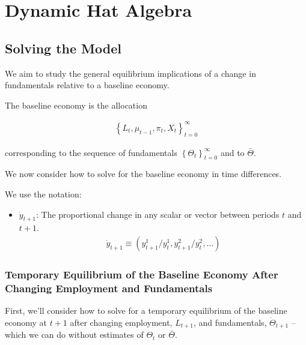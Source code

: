 \documentclass[10pt]{article}
\begin{document}
\section{Dynamic Hat Algebra}

\subsection{Solving the Model}

We aim to study the general equilibrium implications 
of a change in fundamentals relative to a baseline economy.

\begin{definition} 
    The baseline economy is the allocation 
    
    \begin{align}
        \left\{L_t, \mu_{t-1}, \pi_t, X_t\right\}_{t=0}^{\infty}
    \end{align}

    corresponding to the sequence of fundamentals $\left\{\Theta_t\right\}_{t=0}^{\infty}$ and to $\bar{\Theta}$.
\end{definition}

We now consider how to solve for the baseline economy in 
time differences.

We use the notation:

\begin{itemize}
    \item $\dot{y}_{t+1}$: The proportional change in any scalar or 
        vector between periods $t$ and $t+1$.
        \begin{align}
            \dot{y}_{t+1} \equiv\left(y_{t+1}^1 / y_t^1, y_{t+1}^2 / y_t^2, \ldots\right)
        \end{align}
\end{itemize}

\subsubsection{Temporary Equilibrium of the Baseline Economy After Changing Employment and Fundamentals}

First, we'll consider how to solve for a temporary equilibrium
of the baseline economy at $t+1$ after changing employment, $\dot{L}_{t+1}$, 
and fundamentals, $\dot{\Theta}_{t+1}$ -- which we can do without 
estimates of $\Theta_t$ or $\bar{\Theta}$.
\end{document}
